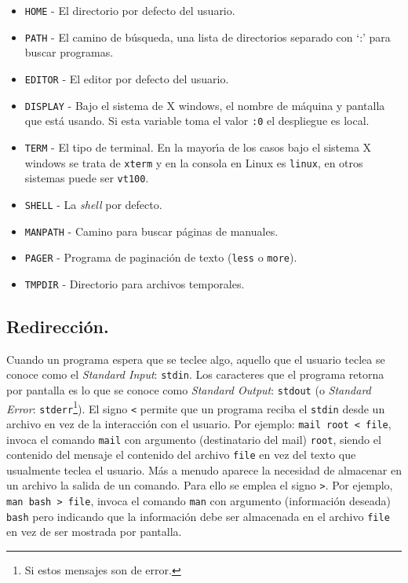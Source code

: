\begin{itemize}
\item \verb+HOME+ - El directorio por defecto del usuario.

\item \verb+PATH+ - El camino de b{\'u}squeda, una lista de directorios
separado con `:' para buscar programas.

\item \verb+EDITOR+ - El editor por defecto del usuario.

\item \verb+DISPLAY+ - Bajo el sistema de X windows, el nombre de
m{\'a}quina y pantalla que est{\'a} usando. Si esta variable toma el valor
\verb+:0+ el despliegue es local.

\item \verb+TERM+ - El tipo de terminal. En la mayor{\'\i}a de los
  casos bajo el sistema X windows se trata de \verb+xterm+ y en la
  consola en Linux es \verb+linux+, en otros sistemas puede ser \verb+vt100+.

\item \verb+SHELL+ - La {\it shell} por defecto.

\item \verb+MANPATH+ - Camino para buscar p{\'a}ginas de manuales.

\item \verb+PAGER+ - Programa de paginaci{\'o}n de texto (\verb+less+ o \verb+more+).

\item \verb+TMPDIR+ - Directorio para archivos temporales.

\end{itemize}


\subsection{Redirecci{\'o}n.}

Cuando un programa espera que se teclee algo, aquello que el usuario
teclea se conoce como el {\it Standard Input}: \verb+stdin+. Los
caracteres que el programa retorna por pantalla es lo que se conoce
como {\it Standard Output}: \verb+stdout+ (o {\it Standard Error}:
\verb+stderr+\footnote{Si estos mensajes son de error.}).  El signo
\verb+<+ permite que un programa reciba el \verb+stdin+ desde un
archivo en vez de la interacci{\'o}n con el usuario. Por ejemplo:
\verb+mail root < file+, invoca el comando \verb+mail+ con argumento
(destinatario del mail) \verb+root+, siendo el contenido del mensaje
el contenido del archivo \verb+file+ en vez del texto que usualmente
teclea el usuario. M{\'a}s a menudo aparece la necesidad de almacenar en
un archivo la salida de un comando. Para ello se emplea el signo
\verb+>+.  Por ejemplo, \verb+man bash > file+, invoca el comando
\verb+man+ con argumento (informaci{\'o}n deseada) \verb+bash+ pero
indicando que la informaci{\'o}n debe ser almacenada en el archivo
\verb+file+ en vez de ser mostrada por pantalla.

